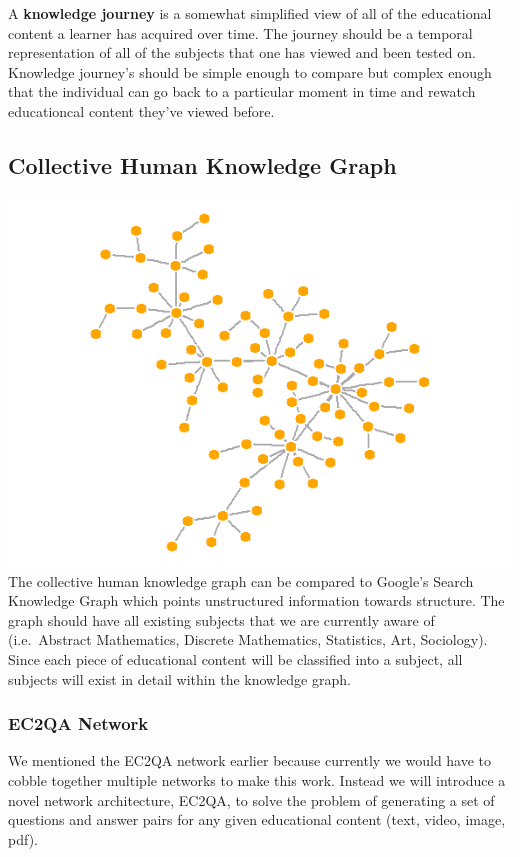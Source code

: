 \documentclass{acm_proc_article-sp}
\begin{document}
A \textbf{knowledge journey} is a somewhat simplified view of all of the
educational content a learner has acquired over time. The journey should
be a temporal representation of all of the subjects that one has viewed
and been tested on. Knowledge journey's should be simple enough to
compare but complex enough that the individual can go back to a
particular moment in time and rewatch educationcal content they've
viewed before.

\subsection{Collective Human Knowledge
Graph}\label{collective-human-knowledge-graph}

\includegraphics{img/knowledge_graphy.png} The collective human
knowledge graph can be compared to Google's Search Knowledge Graph which
points unstructured information towards structure. The graph should have
all existing subjects that we are currently aware of (i.e.~Abstract
Mathematics, Discrete Mathematics, Statistics, Art, Sociology). Since
each piece of educational content will be classified into a subject, all
subjects will exist in detail within the knowledge graph.

\subsubsection{EC2QA Network}\label{ec2qa-network}

We mentioned the EC2QA network earlier because currently we would have
to cobble together multiple networks to make this work. Instead we will
introduce a novel network architecture, EC2QA, to solve the problem of
generating a set of questions and answer pairs for any given educational
content (text, video, image, pdf).
\end{document}
